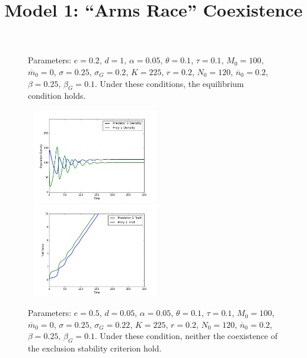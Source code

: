 \documentclass{amsart}
\theoremstyle{definition}
\theoremstyle{remark}
\numberwithin{equation}{section}
\begin{document}
\begin{centering}
\begin{figure}
		\caption{\footnotesize Parameters: $e = 0.2$, $d = 1$, $\alpha = 0.05$, $\theta = 0.1$, $\tau = 0.1$, $M_0 = 100$, $\overline{m}_0 = 0$, $\sigma = 0.25$, $\sigma_G = 0.2$, $K = 225$, $r = 0.2$, $N_0 = 120$, $\overline{n}_0 = 0.2$, $\beta = 0.25$, $\beta_G = 0.1$.  Under these conditions, the equilibrium condition holds.}
		\label{fig:constant_growth_coexistence_equilibrium}
	\end{figure}
	\begin{figure}
		\title{\bf Model 1: ``Arms Race'' Coexistence\\}
		\includegraphics[width=6cm,height=4.1cm]{figures/1x1/constant_growth/densities_unstable_coexistence.png}
		\includegraphics[width=6cm,height=4.1cm]{figures/1x1/constant_growth/traits_unstable_coexistence.png}
		\caption{\footnotesize Parameters: $e = 0.5$, $d = 0.05$, $\alpha = 0.05$, $\theta = 0.1$, $\tau = 0.1$, $M_0 = 100$, $\overline{m}_0 = 0$, $\sigma = 0.25$, $\sigma_G = 0.22$, $K = 225$, $r = 0.2$, $N_0 = 120$, $\overline{n}_0 = 0.2$, $\beta = 0.25$, $\beta_G = 0.1$.  Under these condition, neither the coexistence of the exclusion stability criterion hold.}
		\label{fig:constant_growth_arms_race_coexistence}
	\end{figure}
\end{centering}
\end{document}
